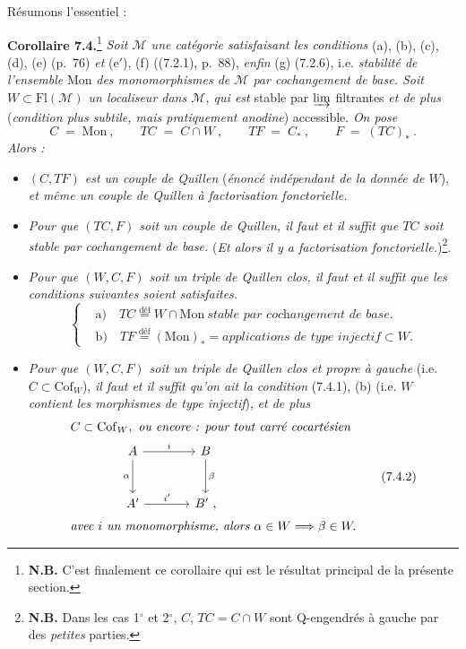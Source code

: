 \documentclass[11pt]{article}
\newcommand{\msp}[1]{\marginpar{\raggedright\footnotesize [#1]}}
\newcommand{\Fl}{\mathrm{Fl}}
\newcommand{\Mon}{\mathrm{Mon}}
\newcommand{\Cof}{\mathrm{Cof}}
\begin{document}
Résumons l'essentiel :

\textbf{Corollaire 7.4.}\footnote[35]{\textbf{N.B.} C'est finalement ce corollaire qui est le résultat principal de la présente section.} \textit{Soit $\mathcal{M}$ une catégorie satisfaisant les conditions} (a), (b), (c), (d), (e) (p.~76) \textit{et} (e$'$), (f) ((7.2.1), p.~88), \textit{enfin} (g) (7.2.6), i.e. \textit{stabilité de l'ensemble} Mon \textit{des monomorphismes de $\mathcal{M}$ par cochangement de base. Soit $W\subset \Fl(\mathcal{M})$ un localiseur dans $\mathcal{M}$, qui est} stable par $\varinjlim$ filtrantes \textit{et de plus} (\textit{condition plus subtile, mais pratiquement anodine}) accessible. \textit{On pose}
\[
C \;=\; \Mon\ , \qquad TC \;=\; C\cap W\ , \qquad TF \;=\; C_*\ , \qquad F \;=\; (TC)_*\ .
\]
\textit{Alors :}
\begin{itemize}[leftmargin=*]
\item[1$^\circ$)] \textit{$(C,TF)$ est un couple de Quillen} (\textit{énoncé indépendant de la donnée de $W$}), \textit{et même un couple de Quillen à factorisation fonctorielle.}
\item[2$^\circ$)] \textit{Pour que $(TC,F)$ soit un couple de Quillen, il faut et il suffit que $TC$ soit stable par cochangement de base.} (\textit{Et alors il y a factorisation fonctorielle.})\footnote[36]{\textbf{N.B.} Dans les cas 1$^\circ$ et 2$^\circ$, $C$, $TC=C\cap W$ sont Q-engendrés à gauche par des \textit{petites} parties.}.
\item[3$^\circ$)] \textit{Pour que $(W,C,F)$ soit un triple de Quillen clos, il faut et il suffit que les conditions suivantes soient satisfaites.}
\[
\left\{
\begin{aligned}
&\text{a)}\quad TC \overset{\text{déf}}{=} W\cap \Mon\ \textit{stable par cochangement de base.}\\
&\text{b)}\quad TF \overset{\text{déf}}{=} (\Mon)_* = \textit{applications de type injectif} \subset W.
\end{aligned}
\right.
\tag*{(7.4.1)}
\]
\item[4$^\circ$)] \msp{page 99}\textit{Pour que $(W,C,F)$ soit un triple de Quillen clos et propre à gauche} (i.e. $C\subset \Cof_W$), \textit{il faut et il suffit qu'on ait la condition} (7.4.1), (b) (i.e. \textit{$W$ contient les morphismes de type injectif}), \textit{et de plus}
\[
\begin{aligned}
&C\subset \Cof_W,\ \textit{ou encore : pour tout carré cocartésien}\\
&\qquad\qquad\begin{tikzcd}[ampersand replacement=\&, row sep=large, column sep=large]
A \arrow[r, "i"] \arrow[d, "\alpha"'] \& B \arrow[d, "\beta"] \\
A' \arrow[r, "i'"] \& B'\ ,
\end{tikzcd}\\
&\textit{avec $i$ un monomorphisme, alors } \alpha\in W \Longrightarrow \beta\in W.
\end{aligned}
\tag*{(7.4.2)}
\]


\end{itemize}
\end{document}
